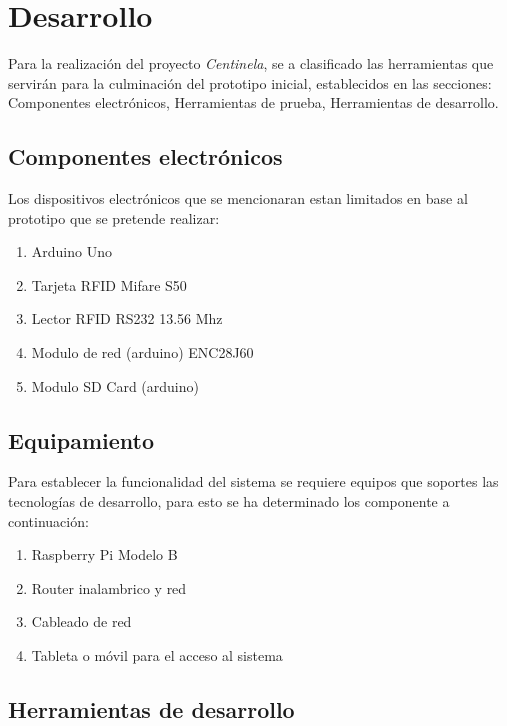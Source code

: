\documentclass[11pt,twocolumn]{article}
\begin{document}
\section{Desarrollo}

Para la realizaci\'on del proyecto \textit{Centinela}, se a clasificado las herramientas que servir\'an para la culminaci\'on del prototipo inicial, establecidos en las secciones: Componentes electr\'onicos, Herramientas de prueba, Herramientas de desarrollo.

	\subsection{Componentes electr\'onicos}

	Los  dispositivos electr\'onicos que se mencionaran estan limitados en base al prototipo que se pretende realizar:\\
	
	\begin{enumerate}
		\item Arduino Uno
		\item Tarjeta RFID Mifare S50
		\item Lector RFID RS232 13.56 Mhz
		\item Modulo de red (arduino) ENC28J60
		\item Modulo SD Card (arduino)
	\end{enumerate}
	
	\subsection{Equipamiento}

	Para establecer la funcionalidad del sistema se requiere equipos que soportes las tecnolog\'ias de desarrollo, para esto se ha determinado los componente a continuaci\'on: \\
	
	\begin{enumerate}
		\item Raspberry Pi Modelo B 
		\item Router inalambrico y red
		\item Cableado de red 
		\item Tableta o m\'ovil para el acceso al sistema
	\end{enumerate}
	
	\subsection{Herramientas de desarrollo}
	
\end{document}
